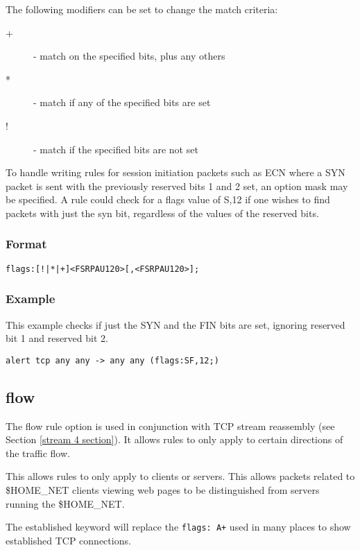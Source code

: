 \documentclass[english]{report}
\begin{document}
The following modifiers can be set to change the match criteria:
\begin{description}
\item [+] - match on the specified bits, plus any others
\item [*] - match if any of the specified bits are set
\item [!] - match if the specified bits are not set
\end{description}

To handle writing rules for session initiation packets such as ECN where a SYN
packet is sent with the previously reserved bits 1 and 2 set, an option mask
may be specified. A rule could check for a flags value of S,12 if one wishes to
find packets with just the syn bit, regardless of the values of the reserved
bits.

\subsubsection{Format}

\begin{verbatim}
flags:[!|*|+]<FSRPAU120>[,<FSRPAU120>];
\end{verbatim}

\subsubsection{Example}

This example checks if just the SYN and the FIN bits are set, ignoring reserved
bit 1 and reserved bit 2.
\begin{verbatim}
alert tcp any any -> any any (flags:SF,12;)
\end{verbatim}

\subsection{flow\label{flow section}}

The flow rule option is used in conjunction with TCP stream reassembly
(see Section \ref{stream 4 section}). It allows rules to only apply
to certain directions of the traffic flow. 

This allows rules to only apply to clients or servers. This allows
packets related to \$HOME\_NET clients viewing web pages to be distinguished
from servers running the \$HOME\_NET.

The established keyword will replace the \texttt{flags: A+} used in
many places to show established TCP connections.
\end{document}
